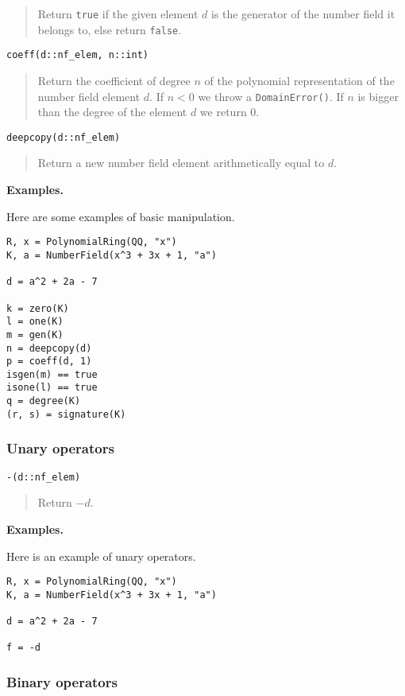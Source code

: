 \documentclass[a4paper,10pt]{article}
\newcommand{\code}{\lstinline}
\newcommand{\desc}[1]{\vspace{-3mm}\begin{quote}#1\end{quote}}
\begin{document}
{{\desc{Return \code{true} if the given element $d$ is the generator of the
number field it belongs to, else return \code{false}.}

\begin{lstlisting}
coeff(d::nf_elem, n::int)
\end{lstlisting}

\desc{Return the coefficient of degree $n$ of the polynomial representation
of the number field element $d$. If $n < 0$ we throw a \code{DomainError()}.
If $n$ is bigger than the degree of the element $d$ we return $0$.}

\begin{lstlisting}
deepcopy(d::nf_elem)
\end{lstlisting}

\desc{Return a new number field element arithmetically equal to $d$.}

\textbf{Examples.}

Here are some examples of basic manipulation.

\begin{lstlisting}
R, x = PolynomialRing(QQ, "x")
K, a = NumberField(x^3 + 3x + 1, "a")

d = a^2 + 2a - 7

k = zero(K)
l = one(K)
m = gen(K)
n = deepcopy(d)
p = coeff(d, 1)
isgen(m) == true
isone(l) == true
q = degree(K)
(r, s) = signature(K)
\end{lstlisting}

\subsubsection{Unary operators}

\begin{lstlisting}
-(d::nf_elem)
\end{lstlisting}

\desc{Return $-d$.}

\textbf{Examples.}

Here is an example of unary operators.

\begin{lstlisting}
R, x = PolynomialRing(QQ, "x")
K, a = NumberField(x^3 + 3x + 1, "a")

d = a^2 + 2a - 7

f = -d
\end{lstlisting}

\subsubsection{Binary operators}

}}
\end{document}
